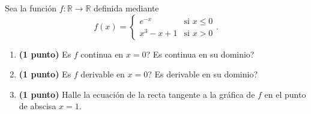 
Sea la función $f:\mathbb{R}\to\mathbb{R}$ definida mediante
\[
f(x)=\begin{cases}e^{-x}&\text{si }x\leq0\\x^3-x+1&\text{si }x>0\end{cases}.
\]
\begin{enumerate}[label=\alph*)]
\item \textbf{(1 punto)} \textquestiondown{}Es $f$ continua en $x=0$? \textquestiondown{}Es continua en su dominio?
\item \textbf{(1 punto)} \textquestiondown{}Es $f$ derivable en $x=0$? \textquestiondown{}Es derivable en su dominio?
\item \textbf{(1 punto)} Halle la ecuación de la recta tangente a la gráfica de $f$ en el punto de abscisa $x=1$.
\end{enumerate}
